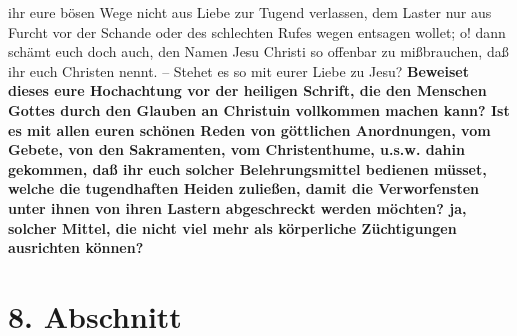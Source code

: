 {ihr eure bösen Wege nicht aus Liebe zur Tugend verlassen, dem Laster nur aus
Furcht vor der Schande oder des schlechten Rufes wegen entsagen wollet; o! dann
schämt euch doch auch, den Namen Jesu Christi so offenbar zu mißbrauchen, daß
ihr euch Christen nennt. -- Stehet es so mit eurer Liebe zu Jesu?
\textbf{Beweiset dieses
eure Hochachtung vor der heiligen Schrift, die den
Menschen Gottes durch den
Glauben an Christuin vollkommen machen kann? Ist es mit allen euren schönen
Reden von göttlichen Anordnungen, vom Gebete, von den
Sakramenten, vom
Christenthume, u.s.w. dahin gekommen, daß ihr euch solcher Belehrungsmittel
bedienen müsset, welche die tugendhaften Heiden zuließen, damit die
Verworfensten unter ihnen von ihren Lastern abgeschreckt werden möchten? ja,
solcher Mittel, die nicht viel mehr als körperliche Züchtigungen ausrichten
können?}

\section{8. Abschnitt} \label{kap17_ab8}

}
